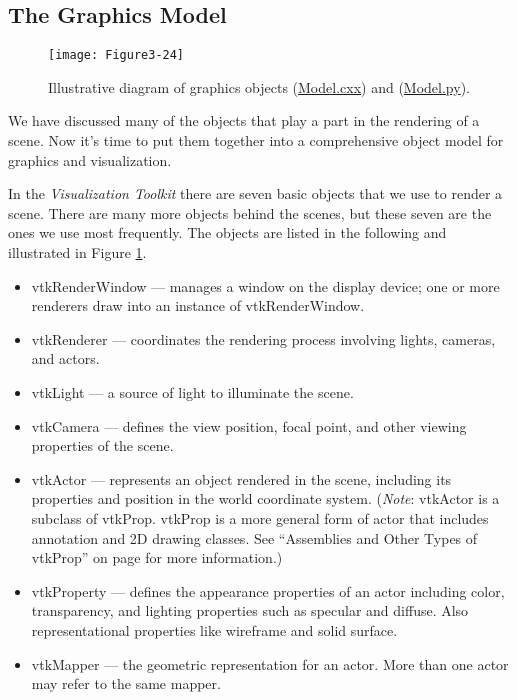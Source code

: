 \subsection{The Graphics Model}

\begin{figure}[!htb]
  \centering
  \texttt{[image: Figure3-24]}\\
  \caption{Illustrative diagram of graphics objects (\href{https://lorensen.github.io/VTKExamples/site/Cxx/Rendering/Model/}{Model.cxx}) and (\href{https://lorensen.github.io/VTKExamples/site/Python/Rendering/Model/}{Model.py}).}\label{fig:Figure3-24}
\end{figure}

We have discussed many of the objects that play a part in the rendering of a scene. Now it's time to put them together into a comprehensive object model for graphics and visualization.

In the \emph{Visualization Toolkit} there are seven basic objects that we use to render a scene. There are many more objects behind the scenes, but these seven are the ones we use most frequently. The objects are listed in the following and illustrated in Figure \ref{fig:Figure3-24}.

\begin{itemize}
\item vtkRenderWindow --- manages a window on the display device; one or   more renderers draw into an instance of vtkRenderWindow.

\item vtkRenderer --- coordinates the rendering process involving lights,   cameras, and actors.

\item vtkLight --- a source of light to illuminate the scene. 

\item vtkCamera --- defines the view position, focal point, and other viewing properties of the scene.

\item vtkActor --- represents an object rendered in the scene, including its properties and position in the world coordinate system. (\emph{Note}: vtkActor is a subclass of vtkProp. vtkProp is a more general form of actor that includes annotation and 2D drawing classes. See ``Assemblies and Other Types of vtkProp'' on page \pageref{subsubsec:assemblies_vtkprop} for more
information.)

\item vtkProperty --- defines the appearance properties of an actor including color, transparency, and lighting properties such as specular and diffuse. Also representational properties like wireframe and solid surface.

\item vtkMapper --- the geometric representation for an actor. More than one actor may refer to the same mapper.
\end{itemize}

